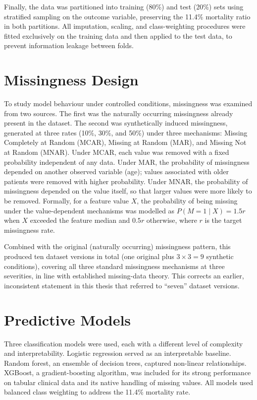 \documentclass[12pt,a4paper]{report}
\begin{document}
Finally, the data was partitioned into training (80\%) and test (20\%) sets using stratified sampling on the outcome variable, preserving the 11.4\% mortality ratio in both partitions. All imputation, scaling, and class-weighting procedures were fitted exclusively on the training data and then applied to the test data, to prevent information leakage between folds.


\section{Missingness Design}
To study model behaviour under controlled conditions, missingness was examined from two sources. The first was the naturally occurring missingness already present in the dataset. The second was synthetically induced missingness, generated at three rates (10\%, 30\%, and 50\%) under three mechanisms: Missing Completely at Random (MCAR), Missing at Random (MAR), and Missing Not at Random (MNAR). Under MCAR, each value was removed with a fixed probability independent of any data. Under MAR, the probability of missingness depended on another observed variable (age); values associated with older patients were removed with higher probability. Under MNAR, the probability of missingness depended on the value itself, so that larger values were more likely to be removed. Formally, for a feature value $X$, the probability of being missing under the value-dependent mechanisms was modelled as $P(M=1 \mid X) = 1.5r$ when $X$ exceeded the feature median and $0.5r$ otherwise, where $r$ is the target missingness rate.

Combined with the original (naturally occurring) missingness pattern, this produced ten dataset versions in total (one original plus $3\times3 = 9$ synthetic conditions), covering all three standard missingness mechanisms at three severities, in line with established missing-data theory. This corrects an earlier, inconsistent statement in this thesis that referred to ``seven'' dataset versions.


\section{Predictive Models}
Three classification models were used, each with a different level of complexity and interpretability. Logistic regression served as an interpretable baseline. Random forest, an ensemble of decision trees, captured non-linear relationships. XGBoost, a gradient-boosting algorithm, was included for its strong performance on tabular clinical data and its native handling of missing values. All models used balanced class weighting to address the 11.4\% mortality rate.
\end{document}
